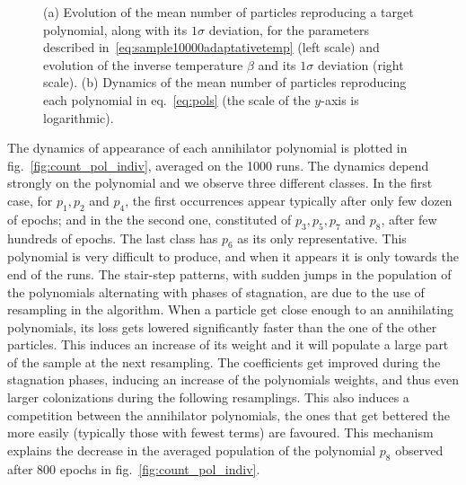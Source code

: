 \documentclass[11pt,a4paper]{article}
\begin{document}
\begin{figure}
{
		}
		\subfigure{\label{fig:count_pol_indiv}}
		\vspace{-1cm}
		\caption{(a) Evolution of the mean number of particles reproducing a target polynomial, along with its $1\sigma$ deviation, for the parameters described in~\eqref{eq:sample10000adaptativetemp} (left scale) and evolution of the inverse temperature $\beta$ and its $1\sigma$ deviation (right scale). (b) Dynamics of the mean number of particles reproducing each polynomial in eq.~\eqref{eq:pols} (the scale of the $y$-axis is logarithmic).}
		\label{fig:evolutionoftargetreproduction}
	\end{figure}

	The dynamics of appearance of each annihilator polynomial is plotted in fig.~\ref{fig:count_pol_indiv}, averaged on the 1000 runs. The dynamics depend strongly on the polynomial and we observe three different classes. In the first case, for $p_{1}, p_{2}$ and $p_{4}$, the first occurrences appear typically after only few dozen of epochs; and in the the second one, constituted of $p_{3}, p_{5}, p_{7}$ and $p_{8}$, after few hundreds of epochs. The last class has $p_{6}$ as its only representative. This polynomial is very difficult to produce, and when it appears it is only towards the end of the runs. The stair-step patterns, with sudden jumps in the population of the polynomials alternating with phases of stagnation, are due to the use of resampling in the algorithm. When a particle get close enough to an annihilating polynomials, its loss gets lowered significantly faster than the one of the other particles. This induces an increase of its weight and it will populate a large part of the sample at the next resampling. The coefficients get improved during the stagnation phases, inducing an increase of the polynomials weights, and thus even larger colonizations during the following resamplings. This also induces a competition between the annihilator polynomials, the ones that get bettered the more easily (typically those with fewest terms) are favoured. This mechanism explains the decrease in the averaged population of the polynomial $p_{8}$ observed after 800 epochs in fig.~\ref{fig:count_pol_indiv}.
\end{document}
